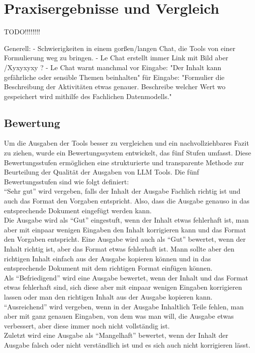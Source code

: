 
\chapter{Praxisergebnisse und Vergleich} 

TODO!!!!!!!!

Generell:
    - Schwierigkeiten in einem gorßen/langen Chat, die Tools von einer Formulierung weg zu bringen. 
    - Le Chat erstellt immer Link mit Bild aber /Xyxyxyxy ?
    - Le Chat warnt manchmal vor Eingabe: "Der Inhalt kann gefährliche oder sensible Themen beinhalten" für Eingabe:
    "Formulier die Beschreibung der Aktivitäten etwas genauer. Beschreibe welcher Wert wo gespeichert wird mithilfe des Fachlichen Datenmodells."


\section{Bewertung}  \label{BewertungLLMTools}

Um die Ausgaben der Tools besser zu vergleichen und ein nachvollziehbares Fazit zu ziehen, wurde ein Bewertungssystem 
entwickelt, das fünf Stufen umfasst. Diese Bewertungsstufen ermöglichen eine strukturierte und transparente Methode 
zur Beurteilung der Qualität der Ausgaben von LLM Tools. Die fünf Bewertungsstufen sind wie folgt definiert:\\

``Sehr gut'' wird vergeben, falls der Inhalt der Ausgabe Fachlich richtig ist und auch das Format den Vorgaben entspricht.
Also, dass die Ausgabe genauso in das entsprechende Dokument eingefügt werden kann.\\
Die Ausgabe wird als ``Gut'' eingestuft, wenn der Inhalt etwas fehlerhaft ist, man aber mit einpaar wenigen Eingaben 
den Inhalt korrigieren kann und das Format den Vorgaben entspricht. Eine Ausgabe wird auch als ``Gut'' bewertet, wenn 
der Inhalt richtig ist, aber das Format etwas fehlerhaft ist. Mann sollte aber den richtigen Inhalt einfach aus der 
Ausgabe kopieren können und in das entsprechende Dokument mit dem richtigen Format einfügen können.\\
Als ``Befriedigend'' wird eine Ausgabe bewertet, wenn der Inhalt und das Format etwas fehlerhaft sind, sich diese aber 
mit einpaar wenigen Eingaben korrigieren lassen oder man den richtigen Inhalt aus der Ausgabe kopieren kann.\\
``Ausreichend'' wird vergeben, wenn in der Ausgabe Inhaltlich Teile fehlen, man aber mit ganz genauen Eingaben, von dem 
was man will, die Ausgabe etwas verbessert, aber diese immer noch nicht vollständig ist.\\
Zuletzt wird eine Ausgabe als ``Mangelhaft'' bewertet, wenn der Inhalt der Ausgabe falsch oder nicht verständlich ist
und es sich auch nicht korrigieren lässt.\\

